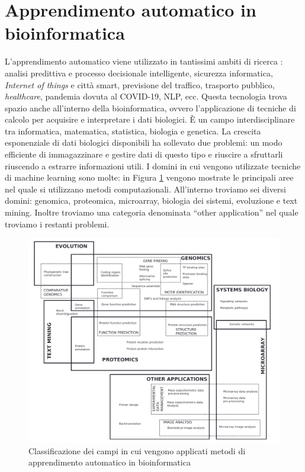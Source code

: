 \documentclass[12pt,italian]{report}
\begin{document}
	\section{Apprendimento automatico in bioinformatica}
	L'apprendimento automatico viene utilizzato in tantissimi ambiti di ricerca \cite{Sarker2021}: analisi predittiva e processo decisionale intelligente, sicurezza informatica, \textit{Internet of things} e città smart, previsione del traffico, trasporto pubblico, \textit{healthcare}, pandemia dovuta al COVID-19, NLP, ecc.
	Questa tecnologia trova spazio anche all'interno della bioinformatica, ovvero l'applicazione di tecniche di calcolo per acquisire e interpretare i dati biologici. È un campo interdisciplinare tra informatica, matematica, statistica, biologia e genetica. 	
	La crescita esponenziale di dati biologici disponibili ha sollevato due problemi: un modo efficiente di immagazzinare e gestire dati di questo tipo e riuscire a sfruttarli riuscendo a estrarre informazioni utili. I domini in cui vengono utilizzate tecniche di machine learning sono molte: in Figura \ref{fig:utilizzimachinelearningbioinfo} vengono mostrate le principali aree nel quale si utilizzano metodi computazionali. All'interno troviamo sei diversi domini: genomica, proteomica, microarray, biologia dei sistemi, evoluzione e text mining. Inoltre troviamo una categoria denominata ``other application'' nel quale troviamo i restanti problemi. 
	
	\begin{figure}[h]
		\centering
		\includegraphics[width=0.8\linewidth]{immagini/utilizziMachineLearningBioinfo}
		\caption[]{Classificazione dei campi in cui vengono applicati metodi di apprendimento automatico in bioinformatica}
		\label{fig:utilizzimachinelearningbioinfo}
	\end{figure}
\end{document}
